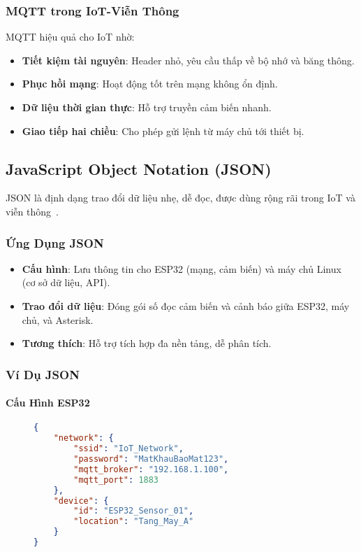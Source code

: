 \subsubsection{MQTT trong IoT-Viễn Thông}
\label{subsubsec:mqtt_iot_integration}

MQTT hiệu quả cho IoT nhờ:

\begin{itemize}
    \item \textbf{Tiết kiệm tài nguyên}: Header nhỏ, yêu cầu thấp về bộ nhớ và băng thông.
    \item \textbf{Phục hồi mạng}: Hoạt động tốt trên mạng không ổn định.
    \item \textbf{Dữ liệu thời gian thực}: Hỗ trợ truyền cảm biến nhanh.
    \item \textbf{Giao tiếp hai chiều}: Cho phép gửi lệnh từ máy chủ tới thiết bị.
\end{itemize}

\subsection{JavaScript Object Notation (JSON)}
\label{subsec:json_format}

JSON là định dạng trao đổi dữ liệu nhẹ, dễ đọc, được dùng rộng rãi trong IoT và viễn thông~\cite{json_rfc7159}.

\subsubsection{Ứng Dụng JSON}
\label{subsubsec:json_applications}

\begin{itemize}
    \item \textbf{Cấu hình}: Lưu thông tin cho ESP32 (mạng, cảm biến) và máy chủ Linux (cơ sở dữ liệu, API).
    \item \textbf{Trao đổi dữ liệu}: Đóng gói số đọc cảm biến và cảnh báo giữa ESP32, máy chủ, và Asterisk.
    \item \textbf{Tương thích}: Hỗ trợ tích hợp đa nền tảng, dễ phân tích.
\end{itemize}

\subsubsection{Ví Dụ JSON}
\label{subsubsec:json_examples}

\paragraph{Cấu Hình ESP32}
\begin{figure}[htbp]
  \centering
  \begin{lstlisting}[language=json, caption=Cấu hình ESP32, label=lst:esp32_config]
{
    "network": {
        "ssid": "IoT_Network",          
        "password": "MatKhauBaoMat123",
        "mqtt_broker": "192.168.1.100", 
        "mqtt_port": 1883              
    },
    "device": {
        "id": "ESP32_Sensor_01",      
        "location": "Tang_May_A"     
    }
}
  \end{lstlisting}
\end{figure}

